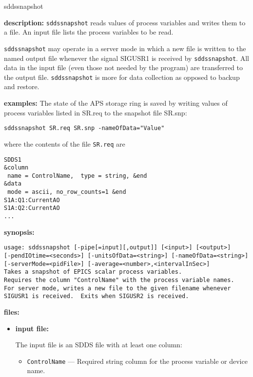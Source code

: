 \begin{sddsprog}{sddssnapshot}
\item {\bf description:}
\verb+sddssnapshot+ reads values of process variables and writes them to a file.
An input file lists the process variables to be read.

\verb+sddssnapshot+ may operate in a server mode in which a new file is written to the named output file whenever the signal SIGUSR1 is received
by \verb+sddssnapshot+.
All data in the input file (even those not needed by the program) are transferred to the output file.
\verb+sddssnapshot+ is more for data collection as opposed to backup and restore.

\item {\bf examples:}
% 
The state of the APS storage ring is saved by writing 
values of process variables listed in SR.req
to the snapshot file SR.snp:
\begin{verbatim}
sddssnapshot SR.req SR.snp -nameOfData="Value"
\end{verbatim}
where the contents of the file \verb+SR.req+ are
\begin{verbatim}
SDDS1
&column
 name = ControlName,  type = string, &end
&data
 mode = ascii, no_row_counts=1 &end
S1A:Q1:CurrentAO
S1A:Q2:CurrentAO
...
\end{verbatim}

\item {\bf synopsis:} 
\begin{verbatim}
usage: sddssnapshot [-pipe[=input][,output]] [<input>] [<output>]
[-pendIOtime=<seconds>] [-unitsOfData=<string>] [-nameOfData=<string>]
[-serverMode=<pidFile>] [-average=<number>,<intervalInSec>]
Takes a snapshot of EPICS scalar process variables.
Requires the column "ControlName" with the process variable names.
For server mode, writes a new file to the given filename whenever
SIGUSR1 is received.  Exits when SIGUSR2 is received.
\end{verbatim}
\item {\bf files:}
\begin{itemize}
\item {\bf input file:}\par
The input file is an SDDS file with at least one column:
\begin{itemize}
        \item {\tt ControlName} --- Required string column for the process variable or device name.
\end{itemize}


\end{itemize}
\end{sddsprog}

